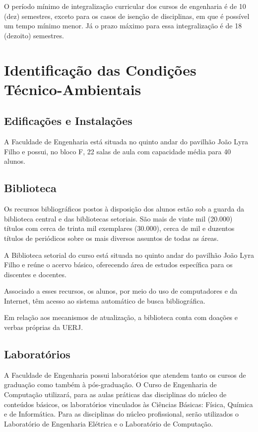 O período mínimo de integralização curricular dos cursos de engenharia é de 10 (dez) semestres, exceto para os casos de isenção de disciplinas, em que é possível um tempo mínimo menor. Já o prazo máximo para essa integralização é de 18 (dezoito) semestres.


\section{Identificação das Condições Técnico-Ambientais}

\subsection{Edificações e Instalações}
A Faculdade de Engenharia está situada no quinto andar do pavilhão João Lyra Filho e possui, no bloco F, 22 salas de aula com capacidade média para 40 alunos. 

\subsection{Biblioteca}
Os recursos bibliográficos postos à disposição dos alunos estão sob a guarda da biblioteca central e das bibliotecas setoriais. São mais de vinte mil (20.000) títulos com cerca de trinta mil exemplares (30.000), cerca de mil e duzentos títulos de periódicos sobre os mais diversos assuntos de todas as áreas.

A Biblioteca setorial do curso está situada no quinto andar do pavilhão João Lyra Filho e reúne o acervo básico, oferecendo área de estudos específica para os discentes e docentes.
 
Associado a esses recursos, os alunos, por meio do uso de computadores e da Internet, têm acesso ao sistema automático de busca bibliográfica.

Em relação aos mecanismos de atualização, a biblioteca conta com doações e verbas próprias da UERJ.

\subsection{Laboratórios}
A Faculdade de Engenharia possui laboratórios que atendem tanto os cursos de graduação como também à pós-graduação. O Curso de Engenharia de Computação utilizará, para as aulas práticas das disciplinas do núcleo de conteúdos básicos, os laboratórios vinculados às Ciências Básicas: Física, Química e de Informática. Para as disciplinas do núcleo profissional, serão utilizados o Laboratório de Engenharia Elétrica e o Laboratório de Computação. 

